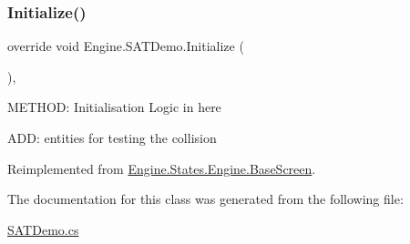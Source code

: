 \subsubsection{\texorpdfstring{Initialize()}{Initialize()}}
{\footnotesize\ttfamily override void Engine.\+S\+A\+T\+Demo.\+Initialize (\begin{DoxyParamCaption}{ }\end{DoxyParamCaption})\hspace{0.3cm}{\ttfamily [inline]}, {\ttfamily [virtual]}}



M\+E\+T\+H\+OD\+: Initialisation Logic in here 

A\+DD\+: entities for testing the collision 

Reimplemented from \hyperlink{a00550_af8fd6890abf865641e190578ef2e054c}{Engine.\+States.\+Engine.\+Base\+Screen}.



The documentation for this class was generated from the following file\+:\begin{DoxyCompactItemize}
\item 
\hyperlink{a00206}{S\+A\+T\+Demo.\+cs}\end{DoxyCompactItemize}
